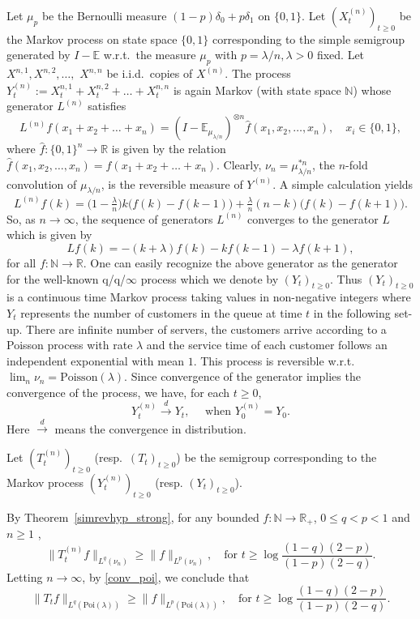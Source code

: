 \documentclass[11pt]{amsart}
\newcommand{\E}{\mathbb{E}}
\newcommand{\1}{\mathbf{1}}
\def\E{{\mathbb E}}
\theoremstyle{definition}
\theoremstyle{plain}
\theoremstyle{remark}
\numberwithin{equation}{section}
\begin{document}
Let $\mu_p$ be the Bernoulli measure $  (1-p)\delta_0 + p \delta_1$ on $\{0, 1\}$. Let $(X^{(n)}_t)_{ t \ge 0}$ be the Markov process on state space $\{0, 1\}$ corresponding to the simple semigroup generated by  $I - \E$ w.r.t.\ the measure $\mu_p$ with $p = \lambda/n, \lambda>0$ fixed. Let $ X^{n, 1}, X^{n, 2}, \ldots,$ $ X^{n, n}$ be i.i.d.\ copies of $X^{(n)}$. The process $Y^{(n)}_t := X^{n, 1}_t+ X^{n, 2}_t + \ldots+ X^{n, n}_t$  is again Markov (with state space $\mathbb N$) whose generator $L^{(n)}$ satisfies
\[ L^{(n)} f(x_1+ x_2 + \ldots+ x_n) = (I - \E_{\mu_{\lambda/n}})^{\otimes n} \hat f(x_1, x_2, \ldots, x_n), \quad x_i \in \{0, 1\}, \]
where $\hat f : \{0,1\}^n \to \mathbb R$ is given by the relation $\hat f(x_1, x_2, \ldots, x_n)  = f(x_1+x_2 +\ldots+x_n)$. Clearly, $\nu_n = \mu_{\lambda/n}^{*n }$, the $n$-fold convolution of $\mu_{\lambda/n}$, is the reversible measure of $Y^{(n)}$.
A simple calculation yields
\[  L^{(n)} f(k)  =  \big (1- \tfrac{\lambda}{n} \big )k \big (f(k) - f(k-1) \big ) + \tfrac{\lambda}{n}(n-k) \big(f(k) - f(k+1) \big).    \]
So, as $n \to \infty$,  the sequence of generators $L^{(n)}$ converges to the generator $L$ which is given by
\[ L f(k) = - (k+ \lambda) f(k) - kf(k-1) - \lambda f(k+1),  \]
for all $f :\mathbb N \to \mathbb R$. One can easily recognize the above generator as the generator for the well-known q/q/$\infty$ process which we denote by $(Y_t)_{ t\ge 0}$.  Thus $(Y_t)_{ t\ge 0}$ is a continuous time Markov process taking values in non-negative integers where $Y_t $ represents the number of customers in the  queue at time $t$ in the following set-up.  There are infinite number of servers, the customers arrive according to a Poisson process with rate $\lambda$ and the service time of each customer follows an independent exponential with mean $1$. This process is reversible w.r.t.\ $\lim_n \nu_n  = \mathrm{Poisson}(\lambda)$.
Since convergence of the generator implies the convergence of the process, we have,
for each $t \ge 0$,
\begin{equation}\label{conv_poi}
 Y^{(n)}_t \stackrel{d}{\to} Y_t,  \quad \text{ when } Y^{(n)}_ 0  = Y_0.
 \end{equation}
Here $\stackrel{d}{\to}$ means the convergence in distribution.

Let $(T^{(n)}_t)_{t\ge 0}$ (resp.\ $(T_t)_{t \ge 0}$)  be the semigroup corresponding to the Markov process $(Y^{(n)}_t)_{t \ge 0}$  (resp. $(Y_t)_{ t \ge 0}$).


 By Theorem~\ref{simrevhyp_strong}, for  any bounded $f :\mathbb N \to \mathbb R_+$,
 $0 \leq q< p< 1$ and $n \ge 1$ ,
\[
\|T^{(n)}_t f\|_{L^q(\nu_n)} \ge \|f \|_{L^p(\nu_n)}, \quad \text{for } t \ge \log \frac{(1-q)(2-p)}{(1-p)(2-q)}.
\]
Letting $n \to \infty$, by \eqref{conv_poi}, we conclude that
\[  \|T_t f\|_{L^q(\mathrm{Poi}(\lambda))} \ge \|f \|_{L^p(\mathrm{Poi}(\lambda))}, \quad \text{for } t \ge \log \frac{(1-q)(2-p)}{(1-p)(2-q)}.\]
\end{document}
